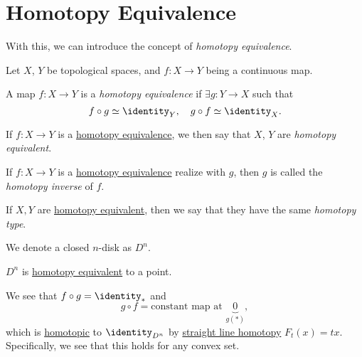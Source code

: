 \section{Homotopy Equivalence}
With this, we can introduce the concept of \emph{homotopy equivalence}.
\begin{definition*}
	Let \(X\), \(Y\) be topological spaces, and \(f\colon X\to Y\) being a continuous map.
	\begin{definition}\label{def:homotopy-equivalence}
		A map \(f\colon X\to Y\) is a \emph{homotopy equivalence} if \(\exists g\colon Y\to X\) such that
		\[
			f\circ g \simeq \identity_Y, \quad g\circ f \simeq \identity_X.
		\]

		\begin{figure}[H]
			\centering
			\label{fig:def:homotopy-equivalence}
		\end{figure}
	\end{definition}

	\begin{definition}\label{def:homotopy-equivalent}
		If \(f\colon X\to Y\) is a \hyperref[def:homotopy-equivalence]{homotopy equivalence}, we then say that \(X\), \(Y\) are \emph{homotopy equivalent}.
	\end{definition}

	\begin{definition}\label{def:homotopy-inverse}
		If \(f\colon X\to Y\) is a \hyperref[def:homotopy-equivalence]{homotopy equivalence} realize with \(g\), then \(g\) is called the \emph{homotopy inverse} of \(f\).
	\end{definition}

	\begin{definition}\label{def:homotopy-type}
		If \(X, Y\) are \hyperref[def:homotopy-equivalence]{homotopy equivalent}, then we say that they have the
		same \emph{homotopy type}.
	\end{definition}

\end{definition*}

\begin{notation}
	We denote a closed \(n\)-disk as \(D^n\).
\end{notation}
\begin{eg}
	\(D^n\) is \hyperref[def:homotopy-equivalence]{homotopy equivalent} to a point.
	\begin{figure}[H]
		\centering
		\label{fig:eg:closed-disk-eq-point}
	\end{figure}
\end{eg}
\begin{explanation}
	We see that \(f\circ g = \identity_\ast\) and
	\[
		g\circ f = \text{constant map at }\underbrace{0}_{g(\ast)},
	\]
	which is \hyperref[def:homotopic]{homotopic} to \(\identity_{D^n}\) by
	\hyperref[eg:lec1:straight-line-homotopy]{straight line homotopy} \(F_t(x) = tx\). Specifically, we see that this holds for any convex set.
\end{explanation}


